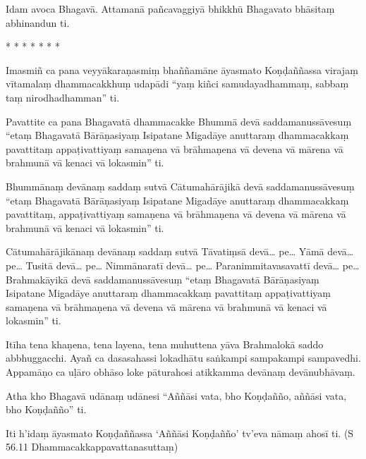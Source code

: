 Idam avoca Bhagavā. Attamanā pañcavaggiyā bhikkhū Bhagavato bhāsitaṃ abhinandun ti.

\begin{center}
    * * * * * * *
\end{center}

Imasmiñ ca pana veyyākaraṇasmiṃ bhaññamāne āyasmato Koṇḍaññassa virajaṃ vītamalaṃ dhammacakkhuṃ udapādi “yaṃ kiñci samudayadhammaṃ, sabbaṃ taṃ nirodhadhamman” ti.

Pavattite ca pana Bhagavatā dhammacakke Bhummā devā saddamanussāvesuṃ “etaṃ Bhagavatā Bārāṇasiyaṃ Isipatane Migadāye anuttaraṃ dhammacakkaṃ pavattitaṃ appaṭivattiyaṃ samaṇena vā brāhmaṇena vā devena vā mārena vā brahmunā vā kenaci vā lokasmin” ti.

Bhummānaṃ devānaṃ saddaṃ sutvā Cātumahārājikā devā saddamanussāvesuṃ “etaṃ Bhagavatā Bārāṇasiyaṃ Isipatane Migadāye anuttaraṃ dhammacakkaṃ pavattitaṃ, appaṭivattiyaṃ samaṇena vā brāhmaṇena vā devena vā mārena vā brahmunā vā kenaci vā lokasmin” ti.

Cātumahārājikānaṃ devānaṃ saddaṃ sutvā Tāvatiṃsā devā… pe… Yāmā devā… pe… Tusitā devā… pe… Nimmānaratī devā… pe… Paranimmitavasavattī devā… pe… Brahmakāyikā devā saddamanussāvesuṃ “etaṃ Bhagavatā Bārāṇasiyaṃ Isipatane Migadāye anuttaraṃ dhammacakkaṃ pavattitaṃ appaṭivattiyaṃ samaṇena vā brāhmaṇena vā devena vā mārena vā brahmunā vā kenaci vā lokasmin” ti.

Itīha tena khaṇena, tena layena‚ tena muhuttena yāva Brahmalokā saddo abbhuggacchi. Ayañ ca dasasahassi lokadhātu saṅkampi sampakampi sampavedhi. Appamāṇo ca uḷāro obhāso loke pāturahosi atikkamma devānaṃ devānubhāvaṃ.

Atha kho Bhagavā udānaṃ udānesi “Aññāsi vata, bho Koṇḍañño, aññāsi vata, bho Koṇḍañño” ti.

Iti h’idaṃ āyasmato Koṇḍaññassa ‘Aññāsi Koṇḍañño’ tv’eva nāmaṃ ahosī ti. \hfill(S 56.11 Dhammacakkappavattanasuttaṃ)